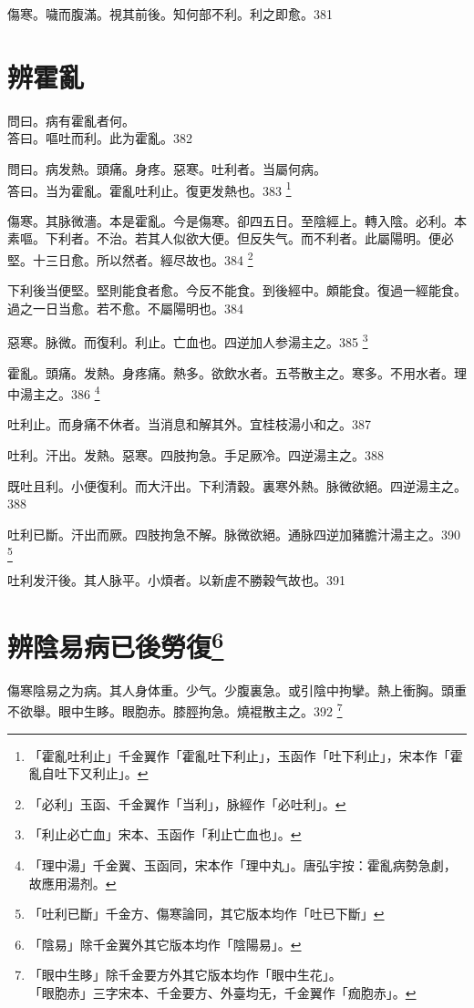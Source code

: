 傷寒。噦而腹滿。視其前後。知何部不利。利之即愈。381

\chapter{辨霍亂}

問曰。病有霍亂者何。\\
答曰。嘔吐而利。此为霍亂。382

問曰。病发熱。頭痛。身疼。惡寒。吐利者。当屬何病。\\
答曰。当为霍亂。霍亂吐利止。復更发熱也。383
	\footnote{「霍亂吐利止」千金翼作「霍亂吐下利止」，玉函作「吐下利止」，宋本作「霍亂自吐下又利止」。}

傷寒。其脉微濇。本是霍亂。今是傷寒。卻四五日。至陰經上。轉入陰。必利。本素嘔。下利者。不治。若其人似欲大便。但反失气。而不利者。此屬陽明。便必堅。十三日愈。所以然者。經尽故也。384
	\footnote{「必利」玉函、千金翼作「当利」，脉經作「必吐利」。}

下利後当便堅。堅則能食者愈。今反不能食。到後經中。頗能食。復過一經能食。過之一日当愈。若不愈。不屬陽明也。384

惡寒。脉微。而復利。利止。亡血也。四逆加人参湯主之。385
	\footnote{「利止必亡血」宋本、玉函作「利止亡血也」。}

霍亂。頭痛。发熱。身疼痛。熱多。欲飲水者。五苓散主之。寒多。不用水者。理中湯主之。386
	\footnote{「理中湯」千金翼、玉函同，宋本作「理中丸」。唐弘宇按：霍亂病勢急劇，故應用湯剂。}

吐利止。而身痛不休者。当消息和解其外。宜桂枝湯小和之。387

吐利。汗出。发熱。惡寒。四肢拘急。手足厥冷。四逆湯主之。388

既吐且利。小便復利。而大汗出。下利清穀。裏寒外熱。脉微欲絕。四逆湯主之。388

吐利已斷。汗出而厥。四肢拘急不解。脉微欲絕。通脉四逆加豬膽汁湯主之。390
	\footnote{「吐利已斷」千金方、傷寒論同，其它版本均作「吐已下斷」}

吐利发汗後。其人脉平。小煩者。以新虗不勝穀气故也。391

\chapter{辨陰易病已後勞復\footnote{「陰易」除千金翼外其它版本均作「陰陽易」。}}

傷寒陰易之为病。其人身体重。少气。少腹裏急。或引陰中拘攣。熱上衝胸。頭重不欲舉。眼中生眵。{\khaaitp 眼胞赤。}膝脛拘急。燒裩散主之。392
	\footnote{「眼中生眵」除千金要方外其它版本均作「眼中生花」。\\「眼胞赤」三字宋本、千金要方、外臺均无，千金翼作「痂胞赤」。}

